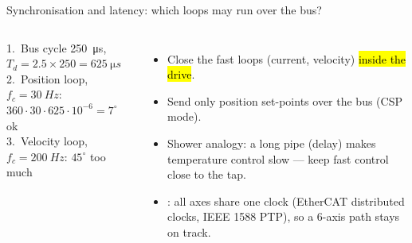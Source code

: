 \documentclass[aspectratio=169,10pt]{beamer}
\newcommand{\lbx}[4]{\draw[thick,fill=#4] (#1,0) rectangle (#2,.6); \node[align=center] at ({(#1+#2)/2},.3) {#3};}
\begin{document}
\begin{frame}{Synchronisation and latency: which loops may run over the bus?}
\centering
{}

\vspace{3mm}
\begin{columns}[T]
\begin{keybox}
\small
1.\ Bus cycle \SI{250}{\micro s}, $T_d=2.5\times250=\SI{625}{\micro s}$\\[1mm]
2.\ Position loop, $f_c=\SI{30}{Hz}$: $360\cdot30\cdot625\cdot10^{-6}=7^\circ$ \textcolor{mkGreen}{ok}\\[1mm]
3.\ Velocity loop, $f_c=\SI{200}{Hz}$: $45^\circ$ \textcolor{mkRed}{too much}
\end{keybox}
\begin{itemize}\small
\item Close the fast loops (current, velocity) \hl{inside the drive}.
\item Send only position set-points over the bus (CSP mode).
\item Shower analogy: a long pipe (delay) makes temperature control slow --- keep fast control close to the tap.
\item {}: all axes share one clock (EtherCAT distributed clocks, IEEE 1588 PTP), so a 6-axis path stays on track.
\end{itemize}
\end{columns}
\end{frame}
\end{document}
